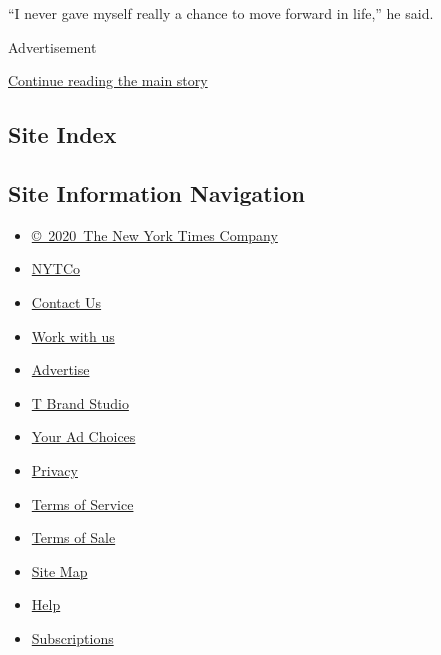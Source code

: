 ``I never gave myself really a chance to move forward in life,'' he
said.

Advertisement

\protect\hyperlink{after-bottom}{Continue reading the main story}

\hypertarget{site-index}{%
\subsection{Site Index}\label{site-index}}

\hypertarget{site-information-navigation}{%
\subsection{Site Information
Navigation}\label{site-information-navigation}}

\begin{itemize}
\tightlist
\item
  \href{https://help.nytimes3xbfgragh.onion/hc/en-us/articles/115014792127-Copyright-notice}{©~2020~The
  New York Times Company}
\end{itemize}

\begin{itemize}
\tightlist
\item
  \href{https://www.nytco.com/}{NYTCo}
\item
  \href{https://help.nytimes3xbfgragh.onion/hc/en-us/articles/115015385887-Contact-Us}{Contact
  Us}
\item
  \href{https://www.nytco.com/careers/}{Work with us}
\item
  \href{https://nytmediakit.com/}{Advertise}
\item
  \href{http://www.tbrandstudio.com/}{T Brand Studio}
\item
  \href{https://www.nytimes3xbfgragh.onion/privacy/cookie-policy\#how-do-i-manage-trackers}{Your
  Ad Choices}
\item
  \href{https://www.nytimes3xbfgragh.onion/privacy}{Privacy}
\item
  \href{https://help.nytimes3xbfgragh.onion/hc/en-us/articles/115014893428-Terms-of-service}{Terms
  of Service}
\item
  \href{https://help.nytimes3xbfgragh.onion/hc/en-us/articles/115014893968-Terms-of-sale}{Terms
  of Sale}
\item
  \href{https://spiderbites.nytimes3xbfgragh.onion}{Site Map}
\item
  \href{https://help.nytimes3xbfgragh.onion/hc/en-us}{Help}
\item
  \href{https://www.nytimes3xbfgragh.onion/subscription?campaignId=37WXW}{Subscriptions}
\end{itemize}

